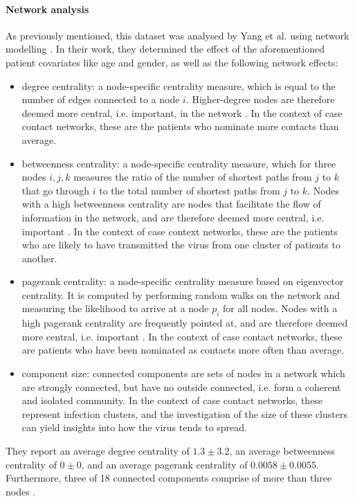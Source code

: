 \paragraph{Network analysis}
As previously mentioned, this dataset was analysed by Yang et al. using network modelling \cite{hainan_publication}. In their work, they determined the effect of the aforementioned patient covariates like age and gender, as well as the following network effects:
\begin{itemize}
	\item degree centrality: a node-specific centrality measure, which is equal to the number of edges connected to a node $i$. Higher-degree nodes are therefore deemed more central, i.e. important, in the network \cite{golbeck}. In the context of case contact networks, these are the patients who nominate more contacts than average.
	\item betweenness centrality: a node-specific centrality measure, which for three nodes $i,j,k$ measures the ratio of the number of shortest paths from $j$ to $k$ that go through $i$ to the total number of shortest paths from $j$ to $k$. Nodes with a high betweenness centrality are nodes that facilitate the flow of information in the network, and are therefore deemed more central, i.e. important \cite{golbeck}. In the context of case context networks, these are the patients who are likely to have transmitted the virus from one cluster of patients to another.
	\item pagerank centrality: a node-specific centrality measure based on eigenvector centrality. It is computed by performing random walks on the network and measuring the likelihood to arrive at a node $p_i$ for all nodes. Nodes with a high pagerank centrality are frequently pointed at, and are therefore deemed more central, i.e. important \cite{gleich_pagerank}. In the context of case contact networks, these are patients who have been nominated as contacts more often than average.
	\item component size: connected components are sets of nodes in a network which are strongly connected, but have no outside connected, i.e. form a coherent and isolated community. In the context of case contact networks, these represent infection clusters, and the investigation of the size of these clusters can yield insights into how the virus tends to spread.
\end{itemize} They report an average degree centrality of $1.3\pm3.2$, an average betweenness centrality of $0\pm0$, and an average pagerank centrality of $0.0058\pm0.0055$. Furthermore, three of 18 connected components comprise of more than three nodes \cite{hainan_publication}. 

